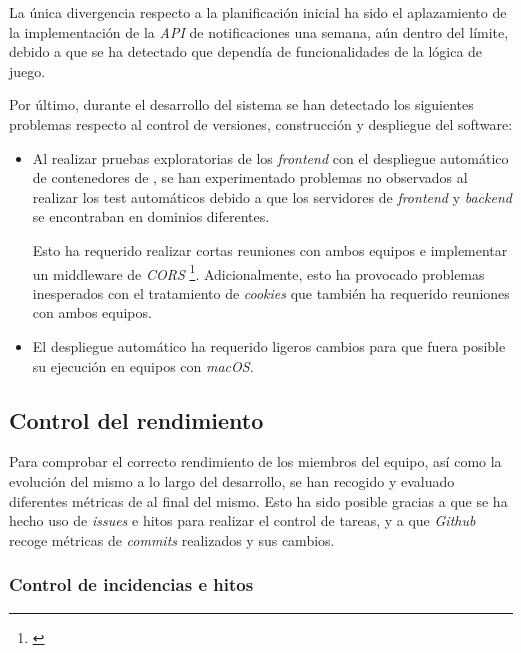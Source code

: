 \documentclass[11pt, a4paper, titlepage]{article}
\begin{document}
La única divergencia respecto a la planificación inicial ha sido el aplazamiento de la implementación de la \textit{API} de notificaciones una semana, aún dentro del límite, debido a que se ha detectado que dependía de funcionalidades de la lógica de juego. \\

\newpage

Por último, durante el desarrollo del sistema se han detectado los siguientes problemas respecto al control de versiones, construcción y despliegue del software:
\begin{itemize}
    \item Al realizar pruebas exploratorias de los \textit{frontend} con el despliegue automático de contenedores de , se han experimentado problemas no observados al realizar los test automáticos debido a que los servidores de \textit{frontend} y \textit{backend} se encontraban en dominios diferentes.

    Esto ha requerido realizar cortas reuniones con ambos equipos e implementar un middleware de \textit{CORS} \footnote{\href{https://developer.mozilla.org/en-US/docs/Web/HTTP/CORS}{}}. Adicionalmente, esto ha provocado problemas inesperados con el tratamiento de \textit{cookies} que también ha requerido reuniones con ambos equipos.

    \item El despliegue automático ha requerido ligeros cambios para que fuera posible su ejecución en equipos con \textit{macOS}.
\end{itemize}

\subsection{Control del rendimiento}
Para comprobar el correcto rendimiento de los miembros del equipo, así como la evolución del mismo a lo largo del desarrollo, se han recogido y evaluado diferentes métricas de  al final del mismo. Esto ha sido posible gracias a que se ha hecho uso de \textit{issues} e hitos para realizar el control de tareas, y a que \textit{Github} recoge métricas de \textit{commits} realizados y sus cambios.

\subsubsection{Control de incidencias e hitos} %
\end{document}

